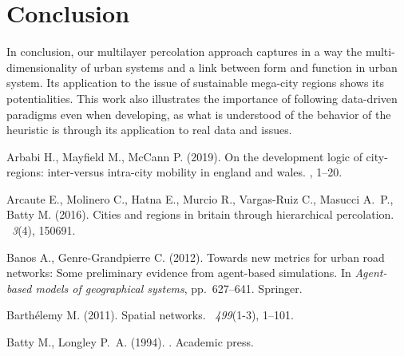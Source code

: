 \documentclass{article}
\begin{document}
  

\section{Conclusion}


In conclusion, our multilayer percolation approach captures in a way the multi-dimensionality of urban systems and a link between form and function in urban system. Its application to the issue of sustainable mega-city regions shows its potentialities. This work also illustrates the importance of following data-driven paradigms even when developing, as what is understood of the behavior of the heuristic is through its application to real data and issues.


\begin{thebibliography}{}

Arbabi H., Mayfield M., McCann P. (2019).
\newblock On the development logic of city-regions: inter-versus intra-city
  mobility in england and wales.
, 1--20.


Arcaute E., Molinero C., Hatna E., Murcio R., Vargas-Ruiz C., Masucci A.~P.,
  Batty M. (2016).
\newblock Cities and regions in britain through hierarchical percolation.
~{\em 3\/}(4), 150691.


Banos A., Genre-Grandpierre C. (2012).
\newblock Towards new metrics for urban road networks: Some preliminary
  evidence from agent-based simulations.
\newblock In {\em Agent-based models of geographical systems}, pp.\  627--641.
  Springer.


Barth{\'e}lemy M. (2011).
\newblock Spatial networks.
~{\em 499\/}(1-3), 1--101.


Batty M., Longley P.~A. (1994).
.
\newblock Academic press.



\end{thebibliography}
\end{document}
